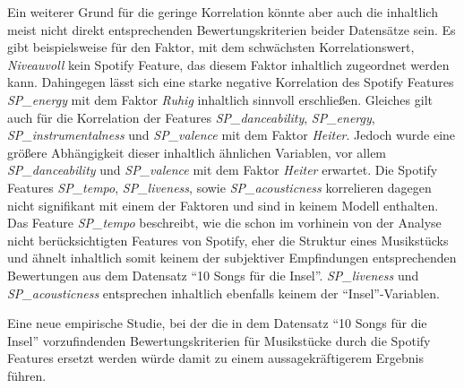 Ein weiterer Grund für die geringe Korrelation könnte aber auch die inhaltlich meist nicht direkt entsprechenden Bewertungskriterien beider Datensätze sein.
Es gibt beispielsweise für den Faktor, mit dem schwächsten Korrelationswert, \textit{Niveauvoll} kein Spotify Feature, das diesem Faktor inhaltlich zugeordnet werden kann.
Dahingegen lässt sich eine starke negative Korrelation des Spotify Features \textit{SP\_energy} mit dem Faktor \textit{Ruhig} inhaltlich sinnvoll erschließen.
Gleiches gilt auch für die Korrelation der Features \textit{SP\_danceability}, \textit{SP\_energy}, \textit{SP\_instrumentalness} und \textit{SP\_valence} mit dem Faktor \textit{Heiter}.
Jedoch wurde eine größere Abhängigkeit dieser inhaltlich ähnlichen Variablen, vor allem \textit{SP\_danceability} und \textit{SP\_valence} mit dem Faktor \textit{Heiter} erwartet.
Die Spotify Features \textit{SP\_tempo}, \textit{SP\_liveness}, sowie \textit{SP\_acousticness} korrelieren dagegen nicht signifikant mit einem der Faktoren und sind in keinem Modell enthalten. 
Das Feature \textit{SP\_tempo} beschreibt, wie die schon im vorhinein von der Analyse nicht berücksichtigten Features von Spotify, eher die Struktur eines Musikstücks und ähnelt inhaltlich somit keinem der subjektiver Empfindungen entsprechenden Bewertungen aus dem Datensatz ``10 Songs für die Insel''.
\textit{SP\_liveness} und \textit{SP\_acousticness} entsprechen inhaltlich ebenfalls keinem der ``Insel''-Variablen.  

Eine neue empirische Studie, bei der die in dem Datensatz ``10 Songs für die Insel'' vorzufindenden Bewertungskriterien für Musikstücke durch die Spotify Features ersetzt werden würde damit zu einem aussagekräftigerem Ergebnis führen.



